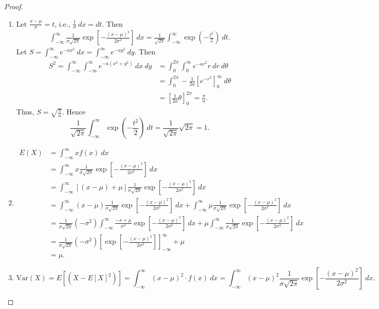 \documentclass[12pt,openany]{book}
\theoremstyle{definition}
\newcommand{\dispsty}{\displaystyle}
\newcommand{\ie}{\textnormal{i.e.}}
\newcommand{\Var}{\text{Var}}
\begin{document}
	\begin{proof}
		\ \begin{enumerate}
			\item Let $\dispsty\frac{x-\mu}{\sigma}=t$, \ie, $\dispsty\frac{1}{\sigma}\ dx=dt$. Then \begin{align*}
			\int_{-\infty}^\infty\frac{1}{\sigma\sqrt{2\pi}}\exp\left[-\frac{(x-\mu)^2}{2\sigma^2}\right]\ dx=\frac{1}{\sqrt{2\pi}}\int_{-\infty}^\infty \exp\left(-\frac{t^2}{2}\right)\ dt.
			\end{align*} Let $\dispsty S=\int_{-\infty}^\infty e^{-ax^2}\ dx=\int_{-\infty}^\infty e^{-ay^2}\ dy$. Then \begin{align*}
			S^2=\int_{-\infty}^{\infty}\int_{-\infty}^{\infty}e^{-a(x^2+y^2)}\ dx\ dy&=\int_0^{2\pi}\int_{0}^{\infty}e^{-ar^2} r\ dr\ d\theta\\
			&=\int_0^{2\pi}-\frac{1}{2a}\left[e^{-r^2}\right]_0^\infty\ d\theta\\
			&=\left[\frac{1}{2a}\theta\right]_0^{2\pi}=\frac{\pi}{a}.
			\end{align*} Thus, $S=\dispsty\sqrt{\frac{\pi}{a}}$. Hence \[
			\frac{1}{\sqrt{2\pi}}\int_{-\infty}^\infty \exp\left(-\frac{t^2}{2}\right)\ dt=\frac{1}{\sqrt{2\pi}}\sqrt{2\pi}=1.
			\]
			\item \begin{align*}
			E(X)&=\int_{-\infty}^\infty xf(x)\ dx\\&=\int_{-\infty}^\infty x\frac{1}{\sigma\sqrt{2\pi}}\exp\left[-\frac{(x-\mu)^2}{2\sigma^2}\right]\ dx\\
			&=\int_{-\infty}^\infty \left[(x-\mu)+\mu\right]\frac{1}{\sigma\sqrt{2\pi}}\exp\left[-\frac{(x-\mu)^2}{2\sigma^2}\right]\ dx\\
			&=\int_{-\infty}^\infty (x-\mu)\frac{1}{\sigma\sqrt{2\pi}}\exp\left[-\frac{(x-\mu)^2}{2\sigma^2}\right]\ dx+\int_{-\infty}^\infty \mu\frac{1}{\sigma\sqrt{2\pi}}\exp\left[-\frac{(x-\mu)^2}{2\sigma^2}\right]\ dx\\
			&=\frac{1}{\sigma\sqrt{2\pi}}(-\sigma^2)\int_{-\infty}^\infty\frac{-x+\mu}{\sigma^2}\exp\left[-\frac{(x-\mu)^2}{2\sigma^2}\right]\ dx +\mu\int_{-\infty}^\infty\frac{1}{\sigma\sqrt{2\pi}}\exp\left[-\frac{(x-\mu)^2}{2\sigma^2}\right]\ dx\\
			&=\frac{1}{\sigma\sqrt{2\pi}}(-\sigma^2)\left[\exp\left[-\frac{(x-\mu)^2}{2\sigma^2}\right]\right]_{-\infty}^\infty+\mu\\
			&=\mu.
			\end{align*}
			\item \[
			\Var(X)=E[(X-E[X]^2)]=\int_{-\infty}^\infty(x-\mu)^2\cdot f(x)\ dx=\int_{-\infty}^\infty(x-\mu)^2\frac{1}{\sigma\sqrt{2\pi}}\exp\left[-\frac{(x-\mu)^2}{2\sigma^2}\right]\ dx.
\]
\end{enumerate}
\end{proof}
\end{document}
